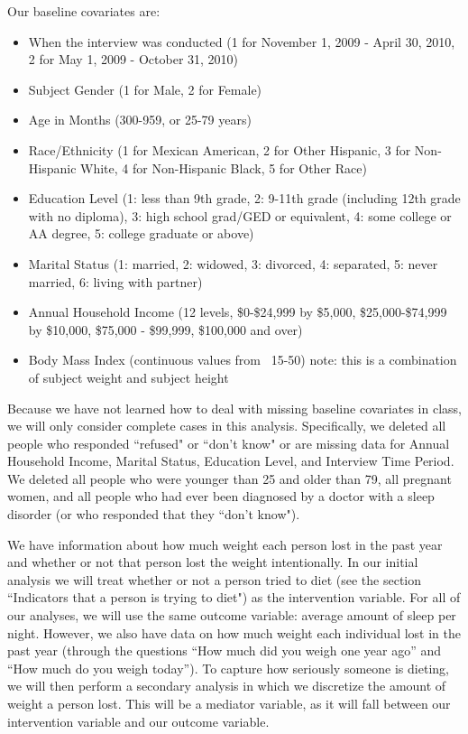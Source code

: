 \documentclass{article}
\begin{document}
Our baseline covariates are:
\begin{itemize}
\item When the interview was conducted (1 for November 1, 2009 - April 30, 2010, 2 for May 1, 2009 - October 31, 2010)
\item Subject Gender (1 for Male, 2 for Female)
\item Age in Months (300-959, or 25-79 years)
\item Race/Ethnicity (1 for Mexican American, 2 for Other Hispanic, 3 for Non-Hispanic White, 4 for Non-Hispanic Black, 5 for Other Race)
\item Education Level (1: less than 9th grade, 2: 9-11th grade (including 12th grade with no diploma), 3: high school grad/GED or equivalent, 4: some college or AA degree, 5: college graduate or above)
\item Marital Status (1: married, 2: widowed, 3: divorced, 4: separated, 5: never married, 6: living with partner)
\item Annual Household Income (12 levels, \$0-\$24,999 by \$5,000, \$25,000-\$74,999 by \$10,000,  \$75,000 - \$99,999, \$100,000 and over)
\item Body Mass Index (continuous values from ~15-50) note: this is a combination of subject weight and subject height
\end{itemize}

Because we have not learned how to deal with missing baseline covariates in class, we will only consider complete cases in this analysis.  Specifically, we deleted all people who responded ``refused" or ``don't know" or are missing data for Annual Household Income, Marital Status, Education Level, and Interview Time Period.  We deleted all people who were younger than 25 and older than 79, all pregnant women, and all people who had ever been diagnosed by a doctor with a sleep disorder (or who responded that they ``don't know").  

We have information about how much weight each person lost in the past year and whether or not that person lost the weight intentionally.  In our initial analysis we will treat whether or not a person tried to diet (see the section ``Indicators that a person is trying to diet") as the intervention variable. For all of our analyses, we will use the same outcome variable: average amount of sleep per night. However, we also have data on how much weight each individual lost in the past year (through the questions ``How much did you weigh one year ago'' and   ``How much do you weigh today'').  To capture how seriously someone is dieting, we will then perform a secondary analysis in which we discretize the amount of weight a person lost.  This will be a mediator variable, as it will fall between our intervention variable and our outcome variable.  
\end{document}
